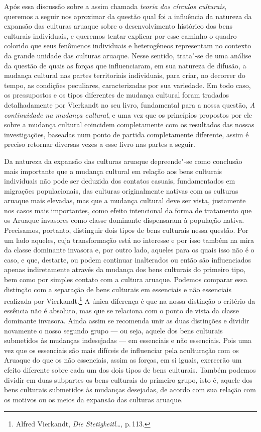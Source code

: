 Após essa discussão sobre a assim chamada \textit{teoria dos círculos
culturais}, queremos a seguir nos aproximar da questão qual foi a
influência da natureza da expansão das culturas aruaque sobre o
desenvolvimento histórico dos bens culturais individuais, e queremos
tentar explicar por esse caminho o quadro colorido que seus fenômenos
individuais e heterogêneos representam no contexto da grande unidade
das culturas aruaque. Nesse sentido, trata"-se de uma análise da questão
de quais as forças que influenciaram, em sua natureza de difusão, a
mudança cultural nas partes territoriais individuais, para criar, no
decorrer do tempo, as condições peculiares, caracterizadas por sua
variedade. Em todo caso, os pressupostos e os tipos diferentes de
mudança cultural foram tradados detalhadamente por Vierkandt no seu
livro, fundamental para a nossa questão, \textit{A continuidade na mudança cultural}, 
e uma vez que
os princípios propostos por ele sobre a mudança cultural coincidem
completamente com os resultados das nossas investigações, baseadas num
ponto de partida completamente diferente, assim é preciso retornar
diversas vezes a esse livro nas partes a seguir.

Da natureza da expansão das culturas aruaque depreende"-se como
conclusão mais importante que a mudança cultural em relação aos bens
culturais individuais não pode ser deduzida dos contatos casuais,
fundamentados em migrações populacionais, das culturas originalmente
nativas com as culturas aruaque mais elevadas, mas que a mudança
cultural deve ser vista, justamente nos casos mais importantes, como
efeito intencional da forma de tratamento que os Aruaque invasores como
classe dominante dispensaram à população nativa. Precisamos, portanto,
distinguir dois tipos de bens culturais nessa questão. Por um lado
aqueles, cuja transformação está no interesse e por isso também na mira
da classe dominante invasora e, por outro lado, aqueles para os quais
isso não é o caso, e que, destarte, ou podem continuar inalterados ou
então são influenciados apenas indiretamente através da mudança dos bens
culturais do primeiro tipo, bem como por simples contato com a cultura
aruaque. Podemos comparar essa distinção com a separação de bens
culturais em essenciais e não essenciais realizada por
Vierkandt.\footnote{Alfred Vierkandt, \textit{Die Stetigkeitl\ldots}, p.\,113.} A única diferença é que na nossa distinção o
critério da essência não é absoluto, mas que se relaciona com o ponto de
vista da classe dominante invasora. Ainda assim se recomenda unir as
duas distinções e dividir novamente o nosso segundo grupo --- ou seja,
aquele dos bens culturais submetidos às mudanças indesejadas --- em
essenciais e não essenciais. Pois uma vez que os essenciais são mais
difíceis de influenciar pela aculturação com os Aruaque do que os
não essenciais, assim as forças, em si iguais, exercerão um efeito
diferente sobre cada um dos dois tipos de bens culturais. Também podemos
dividir em duas subpartes os bens culturais do primeiro grupo, isto é,
aquele dos bens culturais submetidos às mudanças desejadas, de acordo
com sua relação com os motivos ou os meios da expansão das culturas
aruaque.

